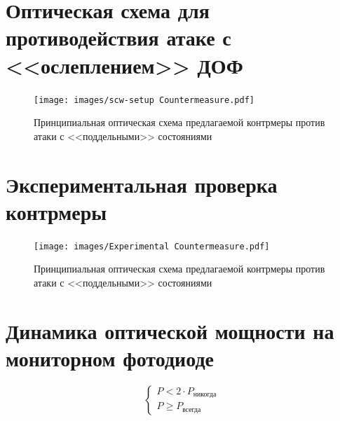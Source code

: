 \section{Оптическая схема для противодействия атаке с <<ослеплением>> ДОФ} \label{ch:ch3/sec4}


 \begin{figure}[ht]
  \centering
  \texttt{[image: images/scw-setup Countermeasure.pdf]}
  \caption{Принципиальная оптическая схема предлагаемой контрмеры против атаки с <<поддельными>> состояниями}
  \label{fig:countermeasure}
\end{figure}

\pagebreak

\section{Экспериментальная проверка контрмеры} \label{ch:ch3/sec5}


 \begin{figure}[ht]
  \centering
  \texttt{[image: images/Experimental Countermeasure.pdf]}
  \caption{Принципиальная оптическая схема предлагаемой контрмеры против атаки с <<поддельными>> состояниями}
  \label{fig:Experimental_countermeasure}
\end{figure}


\pagebreak
\section{Динамика оптической мощности на мониторном фотодиоде}



\[
    \begin{cases}
     P < 2 \cdot P_\text{никогда} \\
     P \geqslant P_\text{всегда}
    \end{cases}
\]

